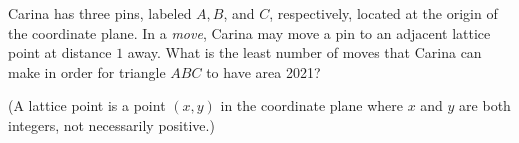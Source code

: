 Carina has three pins, labeled $A, B$, and $C$, respectively, located at the origin of the coordinate plane. In a \textit{move}, Carina may move a pin to an adjacent lattice point at distance $1$ away. What is the least number of moves that Carina can make in order for triangle $ABC$ to have area 2021?

(A lattice point is a point $(x, y)$ in the coordinate plane where $x$ and $y$ are both integers, not necessarily positive.)